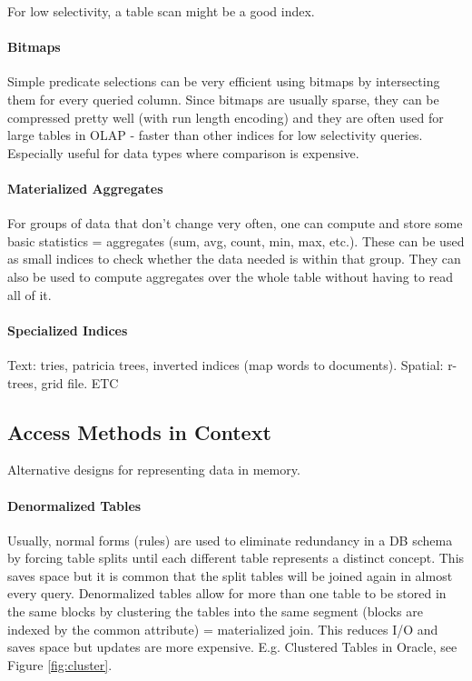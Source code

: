 For low selectivity, a table scan might be a good index. %

\paragraph{Bitmaps}
Simple predicate selections can be very efficient using bitmaps by intersecting them for every queried column. Since bitmaps are usually sparse, they can be compressed pretty well (with run length encoding) and they are often used for large tables in OLAP - faster than other indices for low selectivity queries. Especially useful for data types where comparison is expensive. %

\paragraph{Materialized Aggregates}
For groups of data that don't change very often, one can compute and store some basic statistics = aggregates (sum, avg, count, min, max, etc.). These can be used as small indices to check whether the data needed is within that group. They can also be used to compute aggregates over the whole table without having to read all of it. %

\paragraph{Specialized Indices}
Text: tries, patricia trees, inverted indices (map words to documents). Spatial: r-trees, grid file. ETC %


\subsection{Access Methods in Context}

Alternative designs for representing data in memory.

\paragraph{Denormalized Tables}
Usually, normal forms (rules) are used to eliminate redundancy in a DB schema by forcing table splits until each different table represents a distinct concept. This saves space but it is common that the split tables will be joined again in almost every query. Denormalized tables allow for more than one table to be stored in the same blocks by clustering the tables into the same segment (blocks are indexed by the common attribute) = materialized join. This reduces I/O and saves space but updates are more expensive. E.g. Clustered Tables in Oracle, see Figure \ref{fig:cluster}.

